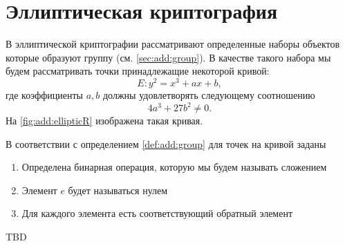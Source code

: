 \section{Эллиптическая криптография}

В эллиптической криптографии рассматривают определенные наборы
объектов которые образуют группу (см. \autoref{sec:add:group}). В
качестве такого набора мы будем рассматривать точки принадлежащие
некоторой кривой: 
\[
E: y^2 = x^3 +a x + b,
\]
где коэффициенты $a,b$ должны удовлетворять следующему соотношению
\[
4 a^3 + 27 b^2 \ne 0.
\]
На \autoref{fig:add:ellipticR} изображена такая кривая.




В соответствии с определением \ref{def:add:group} для точек на кривой 
заданы 
\begin{enumerate}
\item Определена бинарная операция, которую мы будем называть сложением
\item Элемент $e$ будет называться нулем
\item Для каждого элемента есть соответствующий обратный элемент
\end{enumerate}
TBD
